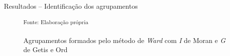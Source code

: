 \documentclass[aspectratio=169]{beamer}
\begin{document}
\begin{frame}{Resultados -- Identificação dos agrupamentos}
	\begin{figure}
		\centering
		\footnotesize
		\hspace{0.2cm}
        \caption{Agrupamentos formados pelo método de \textit{Ward} com \textit{I} de Moran e \textit{G} de Getis e Ord}
        \noindent \small \textsuperscript{Fonte: Elaboração própria}
	\end{figure}
\end{frame}
\end{document}
